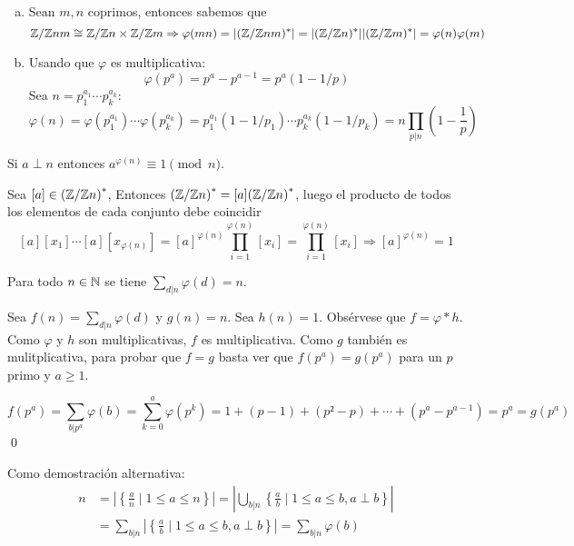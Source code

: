\documentclass[TAN.tex]{subfiles}
\begin{document}
\begin{dem}
\begin{enumerate}[(a)]
\item Sean $m,n$ coprimos, entonces sabemos que 
$$
\mathbb{Z}/\mathbb{Z} nm \cong \mathbb{Z}/\mathbb{Z} n \times \mathbb{Z}/\mathbb{Z} m \Rightarrow \varphi(mn)= |(\mathbb{Z}/\mathbb{Z} nm)^*| = |(\mathbb{Z}/\mathbb{Z} n)^*||(\mathbb{Z}/\mathbb{Z} m)^*| = \varphi(n)\varphi(m)
$$

\item Usando que $φ$ es multiplicativa:
\[ φ(p^a) = p^a - p^{a-1} = p^a(1-1/p) \]
Sea $n = p_1^{a_1}\cdots p_k^{a_k}$:
\[ φ(n) = φ(p_1^{a_1})\cdots φ(p_k^{a_k}) = p_1^{a_1}(1-1/p_1)\cdots p_k^{a_k}(1-1/p_k) = n \prod_{p|n} \left(1-\dfrac{1}{p}\right)\]
\end{enumerate}
\QED
\end{dem}

\begin{teorema}
Si $a \perp n$ entonces $a^{φ(n)} \equiv 1 \pmod n$.
\end{teorema}
\begin{dem}
Sea $[a]\in {\left(\mathbb{Z}/\mathbb{Z}n\right)^\ast}$, Entonces ${\left(\mathbb{Z}/\mathbb{Z} n\right)^\ast} = [a]{\left(\mathbb{Z}/\mathbb{Z}n\right)^\ast}$, luego el producto de todos los elementos de cada conjunto debe coincidir
$$
[a][x_1]\cdots[a][x_{\varphi(n)}] = [a]^{\varphi(n)}\prod_{i=1}^{\varphi(n)} [x_i] = \prod_{i=1}^{\varphi(n)} [x_i] \Rightarrow [a]^{\varphi(n)} = 1
$$
\end{dem}
\begin{prop}
Para todo $n \in \mathbb{N}$ se tiene $\displaystyle\sum_{d|n} φ(d) = n$.
\end{prop}

\begin{dem}
Sea $f(n) = \sum_{d|n} φ(d)$ y $g(n) = n$. Sea $h(n) = 1$. Obsérvese que $f = φ * h$. Como $φ$ y $h$ son multiplicativas, $f$ es multiplicativa. Como $g$ también es mulitplicativa, para probar que $f = g$ basta ver que $f(p^a)=g(p^a)$ para un $p$ primo y $a ≥ 1$.

\[ f(p^a) = \sum_{b|p^a} φ(b) = \sum_{k=0}^a φ(p^k) = 1+(p-1)+(p²-p)+\cdots+(p^a-p^{a-1}) = p^a = g(p^a) \]
\qed

Como demostración alternativa:
\begin{align*}
n&= \left|\left\{\frac{a}{n} \mid 1 ≤ a ≤ n\right\}\right|
= \left|\bigcup_{b|n} \left\{\frac{a}{b} \mid 1≤a≤b, a \perp b\right\}\right|\\
&=\sum_{b|n} \left|\left\{\frac{a}{b} \mid 1 ≤ a ≤ b, a \perp b\right\}\right|
= \sum_{b|n} φ(b) 
\end{align*} \QED
\end{dem}
\end{document}
